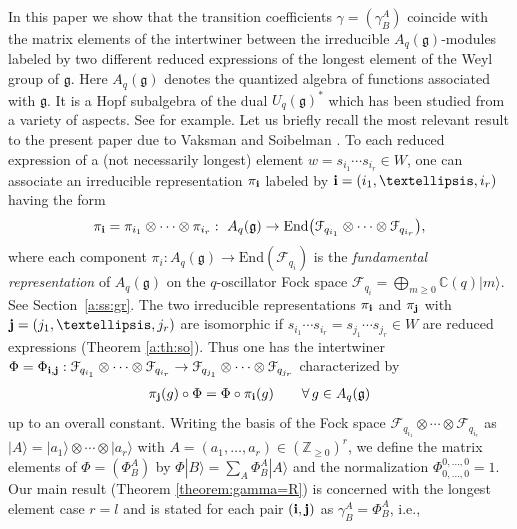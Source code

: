 \documentclass[11pt]{article}
\newcommand{\geh}{\mathfrak{g}}
\newcommand{\Z}{{\mathbb Z}}
\newcommand{\C}{{\mathbb C}}
\begin{document}
In this paper we show that the transition coef\/f\/icients
$\gamma=(\gamma^A_B)$ coincide with
the matrix elements of the intertwiner between the irreducible $A_q(\geh)$-modules labeled by two dif\/ferent reduced expressions of the longest element of the Weyl group of $\geh$.
Here $A_q(\geh)$ denotes the quantized algebra of functions  associated with
$\geh$.
It is a Hopf subalgebra of the dual $U_q(\geh)^\ast$
which has been studied from a variety of aspects.
See \cite{D86,Kas93,NYM,RTF,So1,So2,VS} for example.
Let us brief\/ly recall the most relevant result to the present paper
due to Vaksman and Soibelman \cite{So1,So2,VS}.
To each reduced expression of a (not necessarily longest) element
$w = s_{i_1}\cdots s_{i_r} \in W$,
one can associate an irreducible representation
$\pi_{\bf i}$
labeled by ${\bf i}=(i_1,\ldots, i_r)$ having the form
\begin{gather*}
\pi_{\bf i}= \pi_{i_1}\otimes \cdots \otimes \pi_{i_r}: \
A_q(\geh) \rightarrow
\mathrm{End}\big(\mathcal{F}_{q_{i_1}} \otimes \cdots \otimes
\mathcal{F}_{q_{i_r}}\big),
\end{gather*}
where each component
$\pi_i: A_q(\geh) \rightarrow \mathrm{End}(\mathcal{F}_{q_i})$ is the
{\em fundamental representation} of $A_q(\geh)$ on
the $q$-oscillator Fock space
$\mathcal{F}_{q_i} = \bigoplus_{m\ge 0}\C(q)|m\rangle$.
See Section~\ref{a:ss:gr}.
The two irreducible representations $\pi_{\bf i}$ and
$\pi_{\bf j}$ with ${\bf j}=(j_1,\ldots, j_r)$
are isomorphic if
$s_{i_1}\cdots s_{i_r}=s_{j_1}\cdots s_{j_r} \in W$
are reduced expressions (Theorem \ref{a:th:so}).
Thus one has the intertwiner
$\Phi = \Phi_{{\bf i}, {\bf j}}:
\mathcal{F}_{q_{i_1}}\otimes \cdots \otimes \mathcal{F}_{q_{i_r}}
\rightarrow
\mathcal{F}_{q_{j_1}}\otimes \cdots \otimes \mathcal{F}_{q_{j_r}}$
characterized by
\begin{gather*}
\pi_{\bf j}(g)\circ \Phi = \Phi \circ \pi_{\bf i}(g)\qquad
\forall \, g \in A_q(\mathfrak{g})
\end{gather*}
up to an overall constant.
Writing the basis of the Fock space
$\mathcal{F}_{q_{i_1}} \otimes \cdots \otimes
\mathcal{F}_{q_{i_r}}$ as
$|A\rangle = |a_1\rangle \otimes \cdots \otimes |a_r\rangle$
with $A=(a_1, \ldots, a_r) \in (\Z_{\ge 0})^r$,
we def\/ine the matrix elements of $\Phi=(\Phi^A_B)$ by
$\Phi |B\rangle = \sum_A \Phi^A_B |A\rangle$ and the
normalization $\Phi^{0,\ldots, 0}_{0,\ldots, 0}=1$.
Our main result (Theorem \ref{theorem:gamma=R})
is concerned with the longest element case $r=l$
and is stated for each pair $({\bf i}, {\bf j})$ as $\gamma^A_B = \Phi^A_B$, i.e.,
\end{document}
